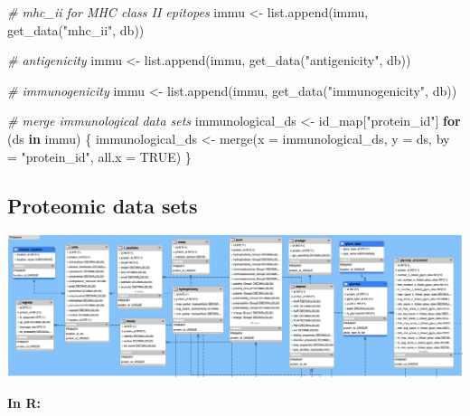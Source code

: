 \documentclass[
  11pt,
  oneside]{book}
\newenvironment{Shaded}{\begin{snugshade}}{\end{snugshade}}
\newcommand{\AttributeTok}[1]{\textcolor[rgb]{0.77,0.63,0.00}{#1}}
\newcommand{\CommentTok}[1]{\textcolor[rgb]{0.56,0.35,0.01}{\textit{#1}}}
\newcommand{\ConstantTok}[1]{\textcolor[rgb]{0.00,0.00,0.00}{#1}}
\newcommand{\ControlFlowTok}[1]{\textcolor[rgb]{0.13,0.29,0.53}{\textbf{#1}}}
\newcommand{\FunctionTok}[1]{\textcolor[rgb]{0.00,0.00,0.00}{#1}}
\newcommand{\NormalTok}[1]{#1}
\newcommand{\OtherTok}[1]{\textcolor[rgb]{0.56,0.35,0.01}{#1}}
\newcommand{\StringTok}[1]{\textcolor[rgb]{0.31,0.60,0.02}{#1}}
\begin{document}
\begin{Shaded}
\begin{Highlighting}[]
\CommentTok{\# mhc\_ii for MHC class II epitopes}
\NormalTok{immu }\OtherTok{\textless{}{-}} \FunctionTok{list.append}\NormalTok{(immu, }\FunctionTok{get\_data}\NormalTok{(}\StringTok{"mhc\_ii"}\NormalTok{, db))}

\CommentTok{\# antigenicity}
\NormalTok{immu }\OtherTok{\textless{}{-}} \FunctionTok{list.append}\NormalTok{(immu, }\FunctionTok{get\_data}\NormalTok{(}\StringTok{"antigenicity"}\NormalTok{, db))}

\CommentTok{\# immunogenicity}
\NormalTok{immu }\OtherTok{\textless{}{-}} \FunctionTok{list.append}\NormalTok{(immu, }\FunctionTok{get\_data}\NormalTok{(}\StringTok{"immunogenicity"}\NormalTok{, db))}

\CommentTok{\# merge immunological data sets}
\NormalTok{immunological\_ds }\OtherTok{\textless{}{-}}\NormalTok{ id\_map[}\StringTok{"protein\_id"}\NormalTok{]}
\ControlFlowTok{for}\NormalTok{ (ds }\ControlFlowTok{in}\NormalTok{ immu) \{}
\NormalTok{  immunological\_ds }\OtherTok{\textless{}{-}} \FunctionTok{merge}\NormalTok{(}\AttributeTok{x =}\NormalTok{ immunological\_ds, }\AttributeTok{y =}\NormalTok{ ds, }\AttributeTok{by =} \StringTok{"protein\_id"}\NormalTok{, }\AttributeTok{all.x =} \ConstantTok{TRUE}\NormalTok{)}
\NormalTok{\}}
\end{Highlighting}
\end{Shaded}

\hypertarget{proteomic-data-sets}{%
\subsection{Proteomic data sets}\label{proteomic-data-sets}}

\begin{center}\includegraphics[width=1\linewidth]{./figures/Supplementary Fig 1 proteomic data} \end{center}

\textbf{In R: }
\end{document}
